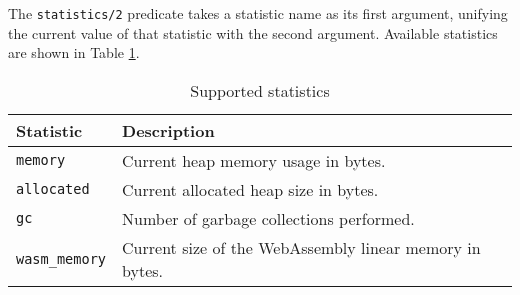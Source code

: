 \begin{appendices}
The \texttt{statistics/2} predicate takes a statistic name as its first argument, unifying the current value of that statistic with the second argument. Available statistics are shown in Table \ref{table:statistics}.

\begin{table}
\centering
\begin{tabular}{ll}
\hline
\textbf{Statistic} & \textbf{Description} \\
\hline
\texttt{memory} & Current heap memory usage in bytes. \\
\texttt{allocated} & Current allocated heap size in bytes. \\
\texttt{gc} & Number of garbage collections performed. \\
\texttt{wasm\_memory} & Current size of the WebAssembly linear memory in bytes. \\
\hline
\end{tabular}
\caption{Supported statistics}
\label{table:statistics}
\end{table}

\end{appendices}